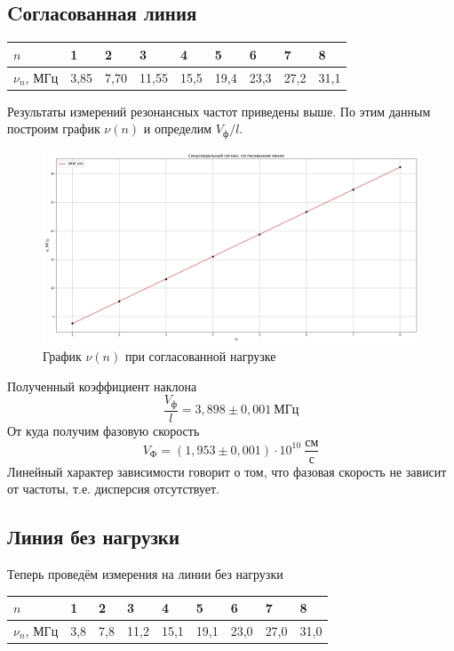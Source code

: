 \documentclass[a4paper,12pt]{article}
\theoremstyle{definition}
\begin{document}
\subsection{Cогласованная линия}
	\begin{table}[h!]
		\begin{center}
		\begin{tabular}{|l|l|l|l|l|l|l|l|l|} \hline
			$n$          & 1    & 2    & 3     & 4    & 5    & 6    & 7    & 8    \\ \hline
			$\nu_n$, МГц & 3,85 & 7,70 & 11,55 & 15,5 & 19,4 & 23,3 & 27,2 & 31,1 \\ \hline
		\end{tabular}
		\end{center}
	\end{table}

	Результаты измерений резонансных частот приведены выше. По этим данным построим график $\nu(n)$ и определим $V_\text{ф}/l$.
 	
	\begin{figure}[h]
		\centering
		\includegraphics[scale=0.38]{graph21.png}
		\caption{График $\nu(n)$ при согласованной нагрузке}
	\end{figure}

	Полученный коэффициент наклона
	\[\frac{V_\text{ф}}{l}=3,898\pm0,001\:\text{МГц}\]
	От куда получим фазовую скорость
	\begin{equation}
		V_\text{Ф}=(1,953\pm0,001)\cdot10^{10}\:\frac{\text{см}}{\text{с}}
	\end{equation}
	Линейный характер зависимости говорит о том, что фазовая скорость не зависит от частоты, т.е. дисперсия отсутствует.
	

\subsection{Линия без нагрузки}
	Теперь проведём измерения на линии без нагрузки
 	\begin{table}[h!]
		\begin{center}
 		\begin{tabular}{|l|l|l|l|l|l|l|l|l|} \hline
 			$n$          & 1   & 2   & 3    & 4    & 5    & 6    & 7    & 8    \\ \hline
 			$\nu_n$, МГц & 3,8 & 7,8 & 11,2 & 15,1 & 19,1 & 23,0 & 27,0 & 31,0 \\ \hline
 		\end{tabular}
	\end{center}
 	\end{table}
\end{document}
